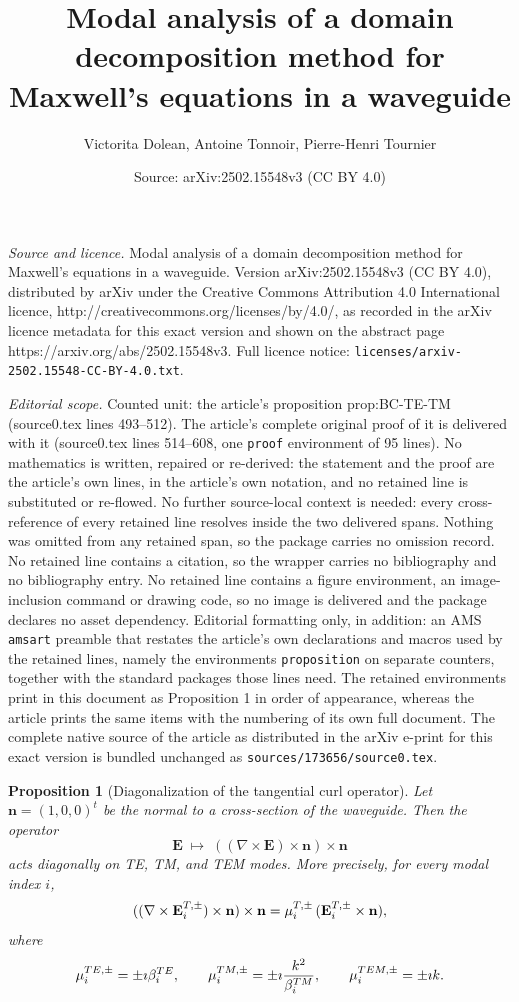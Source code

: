 \documentclass[10pt,a4paper]{amsart}
\title{Modal analysis of a domain decomposition method for Maxwell's equations in a waveguide}
\author{Victorita Dolean, Antoine Tonnoir, Pierre-Henri Tournier}
\date{Source: arXiv:2502.15548v3 (CC BY 4.0)}
\newtheorem{proposition}{Proposition}
\begin{document}
\maketitle

\noindent\emph{Source and licence.} Modal analysis of a domain decomposition method for Maxwell's equations in a waveguide. Version arXiv:2502.15548v3 (CC BY 4.0), distributed by arXiv under the Creative Commons Attribution 4.0 International licence, http://creativecommons.org/licenses/by/4.0/, as recorded in the arXiv licence metadata for this exact version and shown on the abstract page https://arxiv.org/abs/2502.15548v3. Full licence notice: \texttt{licenses/arxiv-2502.15548-CC-BY-4.0.txt}.\par\smallskip

\noindent\textit{Editorial scope.} Counted unit: the article's proposition prop:BC-TE-TM (source0.tex lines 493--512). The article's complete original proof of it is delivered with it (source0.tex lines 514--608, one \texttt{proof} environment of 95 lines). No mathematics is written, repaired or re-derived: the statement and the proof are the article's own lines, in the article's own notation, and no retained line is substituted or re-flowed.  No further source-local context is needed: every cross-reference of every retained line resolves inside the two delivered spans.  Nothing was omitted from any retained span, so the package carries no omission record.  No retained line contains a citation, so the wrapper carries no bibliography and no bibliography entry.  No retained line contains a figure environment, an image-inclusion command or drawing code, so no image is delivered and the package declares no asset dependency.  Editorial formatting only, in addition: an AMS \texttt{amsart} preamble that restates the article's own declarations and macros used by the retained lines, namely the environments \texttt{proposition} on separate counters, together with the standard packages those lines need.  The retained environments print in this document as Proposition 1 in order of appearance, whereas the article prints the same items with the numbering of its own full document.  The complete native source of the article as distributed in the arXiv e-print for this exact version is bundled unchanged as \texttt{sources/173656/source0.tex}.
\begin{proposition}[Diagonalization of the tangential curl operator]\label{prop:BC-TE-TM}
Let $\mathbf n=(1,0,0)^t$ be the normal to a cross-section of the waveguide. Then the operator
\[
\mathbf E \;\longmapsto\; ((\nabla\times \mathbf E)\times \mathbf n)\times \mathbf n
\]
acts diagonally on TE, TM, and TEM modes. More precisely, for every modal index $i$,
\[
((\nabla\times \mathbf E_i^{{\rm T},\pm})\times \mathbf n)\times \mathbf n
=
\mu_i^{\rm T,\pm}\,(\mathbf E_i^{{\rm T},\pm}\times \mathbf n),
\]
where
\[
\mu_i^{\rm TE,\pm}=\pm \imath \beta_i^{\rm TE},
\qquad
\mu_i^{\rm TM,\pm}=\pm \imath \frac{k^2}{\beta_i^{\rm TM}},
\qquad
\mu_i^{\rm TEM,\pm}=\pm \imath k.
\]
\end{proposition}
\end{document}
